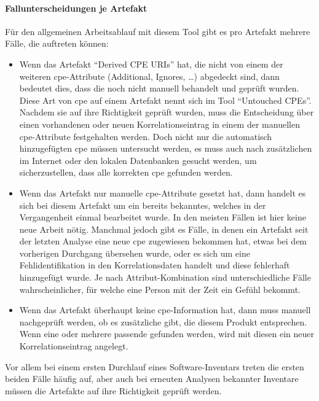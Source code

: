 
\paragraph{Fallunterscheidungen je Artefakt}
Für den allgemeinen Arbeitsablauf mit diesem Tool gibt es pro Artefakt mehrere Fälle, die auftreten können:

\begin{itemize}
    \item Wenn das Artefakt \enquote{Derived CPE URIs} hat, die nicht von einem der weiteren \acrshort{cpe}-Attribute (Additional, Ignores, \ldots) abgedeckt sind, dann bedeutet dies, dass die  noch nicht manuell behandelt und geprüft wurden.
    Diese Art von \acrshort{cpe} auf einem Artefakt nennt sich im Tool \enquote{Untouched CPEs}.
    Nachdem sie auf ihre Richtigkeit geprüft wurden, muss die Entscheidung über einen vorhandenen oder neuen Korrelationseintrag in einem der manuellen \acrshort{cpe}-Attribute festgehalten werden.
    Doch nicht nur die automatisch hinzugefügten \acrshort{cpe} müssen untersucht werden, es muss auch nach zusätzlichen  im Internet oder den lokalen Datenbanken gesucht werden, um sicherzustellen, dass alle korrekten \acrshort{cpe} gefunden werden.

    \item Wenn das Artefakt nur manuelle \acrshort{cpe}-Attribute gesetzt hat, dann handelt es sich bei diesem Artefakt um ein bereits bekanntes, welches in der Vergangenheit einmal bearbeitet wurde.
    In den meisten Fällen ist hier keine neue Arbeit nötig.
    Manchmal jedoch gibt es Fälle, in denen ein Artefakt seit der letzten Analyse eine neue \acrshort{cpe} zugewiesen bekommen hat, etwas bei dem vorherigen Durchgang übersehen wurde, oder es sich um eine Fehlidentifikation in den Korrelationsdaten handelt und diese fehlerhaft hinzugefügt wurde.
    Je nach Attribut-Kombination sind unterschiedliche Fälle wahrscheinlicher, für welche eine Person mit der Zeit ein Gefühl bekommt.

    \item Wenn das Artefakt überhaupt keine \acrshort{cpe}-Information hat, dann muss manuell nachgeprüft werden, ob es zusätzliche gibt, die diesem Produkt entsprechen.
    Wenn eine oder mehrere passende gefunden werden, wird mit diesen ein neuer Korrelationseintrag angelegt.
\end{itemize}

Vor allem bei einem ersten Durchlauf eines Software-Inventars treten die ersten beiden Fälle häufig auf, aber auch bei erneuten Analysen bekannter Inventare müssen die Artefakte auf ihre Richtigkeit geprüft werden.
